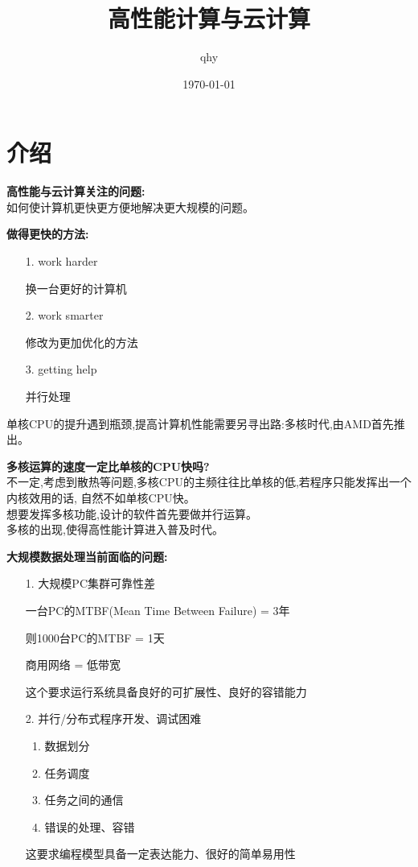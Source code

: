 \documentclass[UTF8,a4paper]{ctexart}
\author{ qhy }
\date{\today}
\title{高性能计算与云计算}
\newcommand{\spaceline}{\vspace{\baselineskip}}
\begin{document}
  \maketitle
  \tableofcontents
  \newpage

  \section{介绍}

  \textbf{高性能与云计算关注的问题:}\\
  如何使计算机更快更方便地解决更大规模的问题。

  \spaceline
  \textbf{做得更快的方法:}
  \begin{enumerate}
    \item [1.] work harder

    换一台更好的计算机

    \item [2.] work smarter

    修改为更加优化的方法

    \item [3.] getting help

    并行处理
  \end{enumerate}

  单核CPU的提升遇到瓶颈,提高计算机性能需要另寻出路:多核时代,由AMD首先推出。

  \spaceline
  \textbf{多核运算的速度一定比单核的CPU快吗?}\\
  不一定,考虑到散热等问题,多核CPU的主频往往比单核的低,若程序只能发挥出一个内核效用的话,
  自然不如单核CPU快。\\
  想要发挥多核功能,设计的软件首先要做并行运算。\\
  多核的出现,使得高性能计算进入普及时代。

  \spaceline
  \textbf{大规模数据处理当前面临的问题:}
  \begin{enumerate}
    \item [1.] 大规模PC集群可靠性差

    一台PC的MTBF(Mean Time Between Failure) = 3年

    则1000台PC的MTBF = 1天

    商用网络 = 低带宽

    这个要求运行系统具备良好的可扩展性、良好的容错能力

    \item [2.] 并行/分布式程序开发、调试困难

    \begin{enumerate}
      \item 数据划分
      \item 任务调度
      \item 任务之间的通信
      \item 错误的处理、容错
    \end{enumerate}

    这要求编程模型具备一定表达能力、很好的简单易用性
  \end{enumerate}
\end{document}
